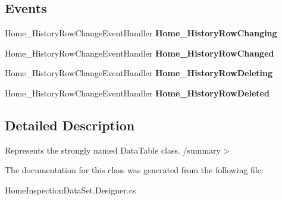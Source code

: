 \subsection*{Events}
\begin{DoxyCompactItemize}
\item 
\mbox{\label{class_a_f_h___scheduler_1_1_home_inspection_data_set_1_1_home___history_data_table_a9487c3535b667c540ff8c4faf166a0a4}} 
Home\+\_\+\+History\+Row\+Change\+Event\+Handler {\bfseries Home\+\_\+\+History\+Row\+Changing}
\item 
\mbox{\label{class_a_f_h___scheduler_1_1_home_inspection_data_set_1_1_home___history_data_table_a39ac339c9580f0d5ddeb6244ddcb2c9d}} 
Home\+\_\+\+History\+Row\+Change\+Event\+Handler {\bfseries Home\+\_\+\+History\+Row\+Changed}
\item 
\mbox{\label{class_a_f_h___scheduler_1_1_home_inspection_data_set_1_1_home___history_data_table_a7db0a59a2cce3094375f09e7d573778b}} 
Home\+\_\+\+History\+Row\+Change\+Event\+Handler {\bfseries Home\+\_\+\+History\+Row\+Deleting}
\item 
\mbox{\label{class_a_f_h___scheduler_1_1_home_inspection_data_set_1_1_home___history_data_table_aa8b8490d8fca090fffbaeae33a2fdd6d}} 
Home\+\_\+\+History\+Row\+Change\+Event\+Handler {\bfseries Home\+\_\+\+History\+Row\+Deleted}
\end{DoxyCompactItemize}


\subsection{Detailed Description}
Represents the strongly named Data\+Table class. /summary$>$ 

The documentation for this class was generated from the following file\+:\begin{DoxyCompactItemize}
\item 
Home\+Inspection\+Data\+Set.\+Designer.\+cs\end{DoxyCompactItemize}
